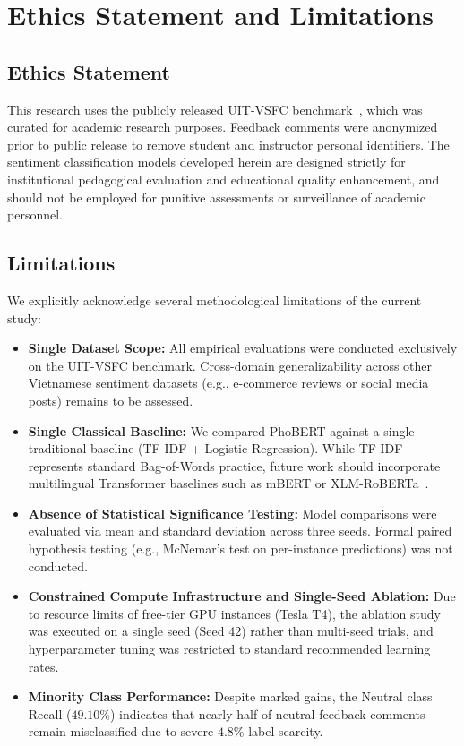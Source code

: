 \documentclass[conference]{IEEEtran}
\begin{document}
\section{Ethics Statement and Limitations}
\subsection{Ethics Statement}
This research uses the publicly released UIT-VSFC benchmark~\cite{vsfc2018}, which was curated for academic research purposes. Feedback comments were anonymized prior to public release to remove student and instructor personal identifiers. The sentiment classification models developed herein are designed strictly for institutional pedagogical evaluation and educational quality enhancement, and should not be employed for punitive assessments or surveillance of academic personnel.

\subsection{Limitations}
We explicitly acknowledge several methodological limitations of the current study:
\begin{itemize}
    \item \textbf{Single Dataset Scope:} All empirical evaluations were conducted exclusively on the UIT-VSFC benchmark. Cross-domain generalizability across other Vietnamese sentiment datasets (e.g., e-commerce reviews or social media posts) remains to be assessed.
    \item \textbf{Single Classical Baseline:} We compared PhoBERT against a single traditional baseline (TF-IDF + Logistic Regression). While TF-IDF represents standard Bag-of-Words practice, future work should incorporate multilingual Transformer baselines such as mBERT or XLM-RoBERTa~\cite{conneau2020unsupervised}.
    \item \textbf{Absence of Statistical Significance Testing:} Model comparisons were evaluated via mean and standard deviation across three seeds. Formal paired hypothesis testing (e.g., McNemar's test on per-instance predictions) was not conducted.
    \item \textbf{Constrained Compute Infrastructure and Single-Seed Ablation:} Due to resource limits of free-tier GPU instances (Tesla T4), the ablation study was executed on a single seed (Seed 42) rather than multi-seed trials, and hyperparameter tuning was restricted to standard recommended learning rates.
    \item \textbf{Minority Class Performance:} Despite marked gains, the Neutral class Recall ($49.10\%$) indicates that nearly half of neutral feedback comments remain misclassified due to severe $4.8\%$ label scarcity.
\end{itemize}
\end{document}
